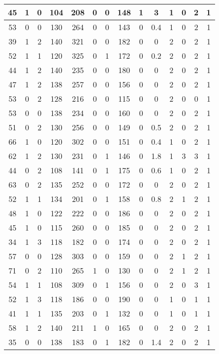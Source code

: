 \documentclass{article}
\begin{document}
\begin{longtable}{|c|c|c|c|c|c|c|c|c|c|c|c|c|c|}
45 & 1 & 0 & 104 & 208 & 0 & 0 & 148 & 1 & 3 & 1 & 0 & 2 & 1 \\ \hline
53 & 0 & 0 & 130 & 264 & 0 & 0 & 143 & 0 & 0.4 & 1 & 0 & 2 & 1 \\ \hline
39 & 1 & 2 & 140 & 321 & 0 & 0 & 182 & 0 & 0 & 2 & 0 & 2 & 1 \\ \hline
52 & 1 & 1 & 120 & 325 & 0 & 1 & 172 & 0 & 0.2 & 2 & 0 & 2 & 1 \\ \hline
44 & 1 & 2 & 140 & 235 & 0 & 0 & 180 & 0 & 0 & 2 & 0 & 2 & 1 \\ \hline
47 & 1 & 2 & 138 & 257 & 0 & 0 & 156 & 0 & 0 & 2 & 0 & 2 & 1 \\ \hline
53 & 0 & 2 & 128 & 216 & 0 & 0 & 115 & 0 & 0 & 2 & 0 & 0 & 1 \\ \hline
53 & 0 & 0 & 138 & 234 & 0 & 0 & 160 & 0 & 0 & 2 & 0 & 2 & 1 \\ \hline
51 & 0 & 2 & 130 & 256 & 0 & 0 & 149 & 0 & 0.5 & 2 & 0 & 2 & 1 \\ \hline
66 & 1 & 0 & 120 & 302 & 0 & 0 & 151 & 0 & 0.4 & 1 & 0 & 2 & 1 \\ \hline
62 & 1 & 2 & 130 & 231 & 0 & 1 & 146 & 0 & 1.8 & 1 & 3 & 3 & 1 \\ \hline
44 & 0 & 2 & 108 & 141 & 0 & 1 & 175 & 0 & 0.6 & 1 & 0 & 2 & 1 \\ \hline
63 & 0 & 2 & 135 & 252 & 0 & 0 & 172 & 0 & 0 & 2 & 0 & 2 & 1 \\ \hline
52 & 1 & 1 & 134 & 201 & 0 & 1 & 158 & 0 & 0.8 & 2 & 1 & 2 & 1 \\ \hline
48 & 1 & 0 & 122 & 222 & 0 & 0 & 186 & 0 & 0 & 2 & 0 & 2 & 1 \\ \hline
45 & 1 & 0 & 115 & 260 & 0 & 0 & 185 & 0 & 0 & 2 & 0 & 2 & 1 \\ \hline
34 & 1 & 3 & 118 & 182 & 0 & 0 & 174 & 0 & 0 & 2 & 0 & 2 & 1 \\ \hline
57 & 0 & 0 & 128 & 303 & 0 & 0 & 159 & 0 & 0 & 2 & 1 & 2 & 1 \\ \hline
71 & 0 & 2 & 110 & 265 & 1 & 0 & 130 & 0 & 0 & 2 & 1 & 2 & 1 \\ \hline
54 & 1 & 1 & 108 & 309 & 0 & 1 & 156 & 0 & 0 & 2 & 0 & 3 & 1 \\ \hline
52 & 1 & 3 & 118 & 186 & 0 & 0 & 190 & 0 & 0 & 1 & 0 & 1 & 1 \\ \hline
41 & 1 & 1 & 135 & 203 & 0 & 1 & 132 & 0 & 0 & 1 & 0 & 1 & 1 \\ \hline
58 & 1 & 2 & 140 & 211 & 1 & 0 & 165 & 0 & 0 & 2 & 0 & 2 & 1 \\ \hline
35 & 0 & 0 & 138 & 183 & 0 & 1 & 182 & 0 & 1.4 & 2 & 0 & 2 & 1 \\ \hline

\end{longtable}
\end{document}
